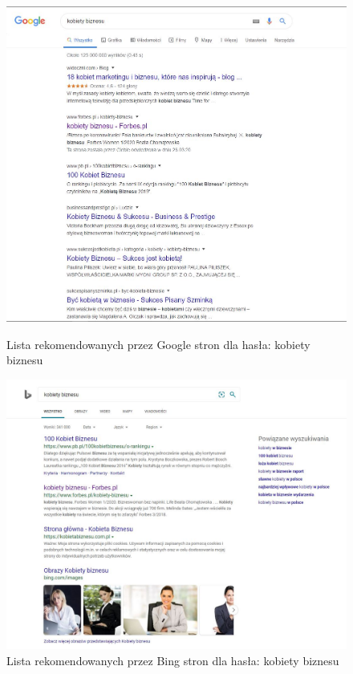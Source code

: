 \documentclass[licencjacka]{pracadypl}
\theoremstyle{definition}
\begin{document}
\begin{figure}[!htb]
	\includegraphics[width=\linewidth]{img/google-query}
	\caption{Lista rekomendowanych przez Google stron dla hasła: kobiety biznesu} \label{google-query}
	\endminipage\hfill 
	\includegraphics[width=\linewidth]{img/bing-query}
	\caption{Lista rekomendowanych przez Bing stron dla hasła: kobiety biznesu} \label{bing-query}
	\endminipage
\end{figure}
\end{document}
